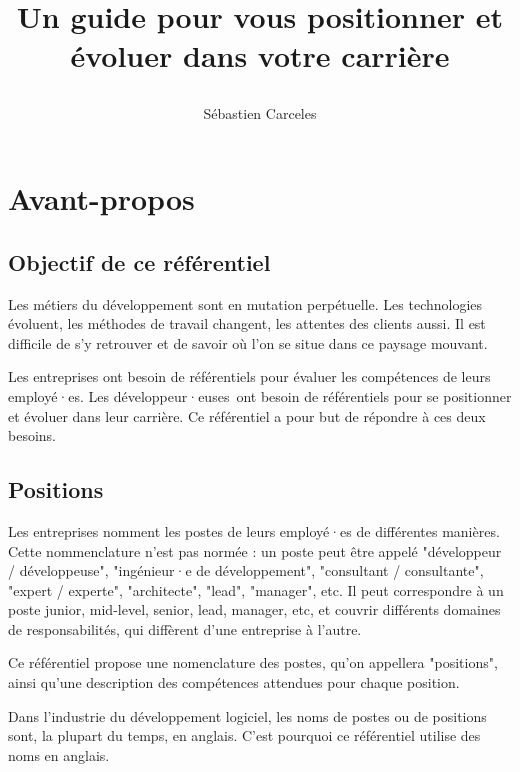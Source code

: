 \documentclass[a4paper, french, openany, 12pt]{book}
\title{
  \vspace*{-8cm}

  \fullwidthimage{images/cover.jpg}

  \vspace*{5cm}

  \bsc{Référenciel de compétences pour développeurs et développeuses}

  Un guide pour vous positionner et évoluer dans votre carrière
}
\author{Sébastien Carceles}
\date{}
\newcommand\devs{développeur·euses}
\begin{document}
\begin{titlepage}
  \maketitle
\end{titlepage}

\frontmatter

\chapter{Avant-propos}

\begin{multicols}{2}
  
  \section*{Objectif de ce référentiel}
  
  Les métiers du développement sont en mutation perpétuelle.
  Les technologies évoluent, les méthodes de travail changent, les attentes des clients aussi.
  Il est difficile de s'y retrouver et de savoir où l'on se situe dans ce paysage mouvant.
  
  Les entreprises ont besoin de référentiels pour évaluer les compétences de leurs employé·es.
  Les \devs\ ont besoin de référentiels pour se positionner et évoluer dans leur carrière.
  Ce référentiel a pour but de répondre à ces deux besoins.
  
  \section*{Positions}
  
  Les entreprises nomment les postes de leurs employé·es de différentes manières.
  Cette nommenclature n'est pas normée : un poste peut être appelé "développeur / développeuse", "ingénieur·e de 
  développement", "consultant / consultante", "expert / experte", "architecte", "lead", "manager", etc.
  Il peut correspondre à un poste junior, mid-level, senior, lead, manager, etc, et couvrir différents domaines de 
  responsabilités, qui diffèrent d'une entreprise à l'autre.
  
  Ce référentiel propose une nomenclature des postes, qu'on appellera "positions",
  ainsi qu'une description des compétences attendues pour chaque position.
  
  Dans l'industrie du développement logiciel, les noms de postes ou de positions sont, la plupart du temps, en anglais.
  C'est pourquoi ce référentiel utilise des noms en anglais.
  

\end{multicols}
\end{document}
